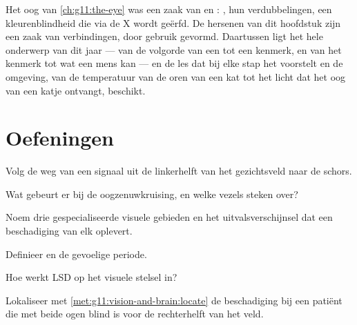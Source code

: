 \begin{remark}\label{rem:g11:vision-and-brain:year}
Het oog van \cref{ch:g11:the-eye} was een zaak van  en :
, hun verdubbelingen, een kleurenblindheid die via de X wordt
geërfd. De hersenen van dit hoofdstuk zijn een zaak van verbindingen, door
gebruik gevormd. Daartussen ligt het hele onderwerp van dit jaar --- van
de volgorde van een  tot een kenmerk, en van het kenmerk tot wat een
mens kan --- en de les dat bij elke stap het  voorstelt en de
omgeving, van de temperatuur van de oren van een kat tot het licht dat het
oog van een katje ontvangt, beschikt.
\end{remark}

\section{Oefeningen}

\begin{exercise}[$\star$]\label{exo:g11:vision-and-brain:1}
Volg de weg van een signaal uit de linkerhelft van het gezichtsveld naar
de schors.
\end{exercise}

\begin{exercise}[$\star$]\label{exo:g11:vision-and-brain:2}
Wat gebeurt er bij de oogzenuwkruising, en welke vezels steken over?
\end{exercise}

\begin{exercise}[$\star$]\label{exo:g11:vision-and-brain:3}
Noem drie gespecialiseerde visuele gebieden en het uitvalsverschijnsel dat
een beschadiging van elk oplevert.
\end{exercise}

\begin{exercise}[$\star$]\label{exo:g11:vision-and-brain:4}
Definieer  en de gevoelige periode.
\end{exercise}

\begin{exercise}[$\star$]\label{exo:g11:vision-and-brain:5}
Hoe werkt LSD op het visuele stelsel in?
\end{exercise}

\begin{exercise}[$\star\star$]\label{exo:g11:vision-and-brain:6}
Lokaliseer met \cref{met:g11:vision-and-brain:locate} de beschadiging bij
een patiënt die met beide ogen blind is voor de rechterhelft van het veld.
\end{exercise}

